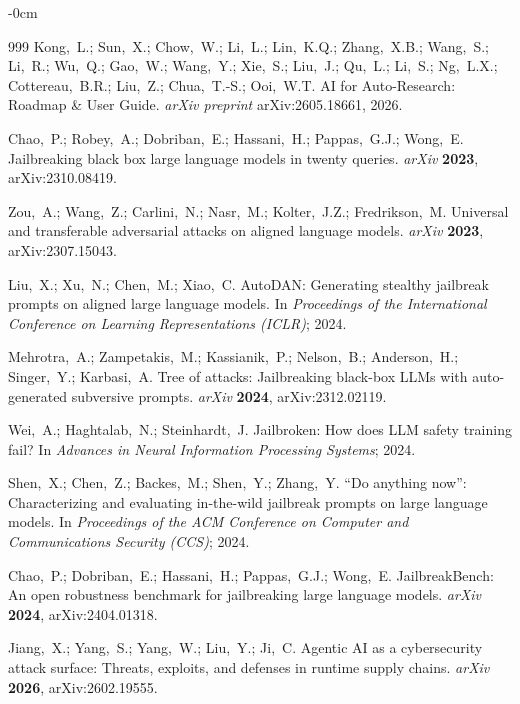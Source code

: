 \documentclass[superintelligence,article,submit,pdftex,moreauthors]{Definitions/mdpi}
\begin{document}
\begin{adjustwidth}{-\extralength}{0cm}
{\begin{thebibliography}{999}
Kong,~L.; Sun,~X.; Chow,~W.; Li,~L.; Lin,~K.Q.; Zhang,~X.B.; Wang,~S.; Li,~R.; Wu,~Q.; Gao,~W.; Wang,~Y.; Xie,~S.; Liu,~J.; Qu,~L.; Li,~S.; Ng,~L.X.; Cottereau,~B.R.; Liu,~Z.; Chua,~T.-S.; Ooi,~W.T.
AI for Auto-Research: Roadmap \& User Guide.
{\em arXiv preprint} arXiv:2605.18661, 2026.

Chao,~P.; Robey,~A.; Dobriban,~E.; Hassani,~H.; Pappas,~G.J.; Wong,~E.
Jailbreaking black box large language models in twenty queries.
{\em arXiv} {\bf 2023}, arXiv:2310.08419.

Zou,~A.; Wang,~Z.; Carlini,~N.; Nasr,~M.; Kolter,~J.Z.; Fredrikson,~M.
Universal and transferable adversarial attacks on aligned language models.
{\em arXiv} {\bf 2023}, arXiv:2307.15043.

Liu,~X.; Xu,~N.; Chen,~M.; Xiao,~C.
{AutoDAN}: Generating stealthy jailbreak prompts on aligned large language models.
In {\em Proceedings of the International Conference on Learning Representations (ICLR)}; 2024.

Mehrotra,~A.; Zampetakis,~M.; Kassianik,~P.; Nelson,~B.; Anderson,~H.; Singer,~Y.; Karbasi,~A.
Tree of attacks: Jailbreaking black-box {LLMs} with auto-generated subversive prompts.
{\em arXiv} {\bf 2024}, arXiv:2312.02119.

Wei,~A.; Haghtalab,~N.; Steinhardt,~J.
Jailbroken: How does {LLM} safety training fail?
In {\em Advances in Neural Information Processing Systems}; 2024.

Shen,~X.; Chen,~Z.; Backes,~M.; Shen,~Y.; Zhang,~Y.
``{D}o anything now'': Characterizing and evaluating in-the-wild jailbreak prompts on large language models.
In {\em Proceedings of the ACM Conference on Computer and Communications Security (CCS)}; 2024.

Chao,~P.; Dobriban,~E.; Hassani,~H.; Pappas,~G.J.; Wong,~E.
{JailbreakBench}: An open robustness benchmark for jailbreaking large language models.
{\em arXiv} {\bf 2024}, arXiv:2404.01318.

Jiang,~X.; Yang,~S.; Yang,~W.; Liu,~Y.; Ji,~C.
Agentic {AI} as a cybersecurity attack surface: Threats, exploits, and defenses in runtime supply chains.
{\em arXiv} {\bf 2026}, arXiv:2602.19555.


\end{thebibliography}}
\end{adjustwidth}
\end{document}
